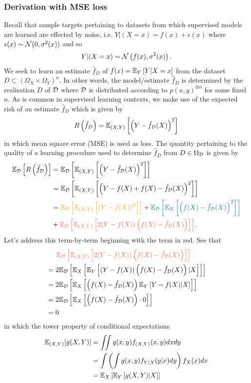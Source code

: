 \documentclass[11pt]{article}
\begin{document}
\subsubsection{Derivation with MSE loss}
Recall that sample targets pertaining to datasets from which supervised models are learned are effected by noise, i.e. $Y|(X=x)=f(x)+\epsilon(x)$ where $\epsilon(x)\sim\mathcal{N}(0,\sigma^2(x))$ and so
$$
Y|(X=x)
\sim
\mathcal{N}\left(f(x), \sigma^2(x)\right).
$$
We seek to learn an estimate $\hat{f}_{D}$ of $f(x)=\mathbb{E}_Y\left[Y|X=x\right]$ from the dataset $D\subset(\Omega_X\times\Omega_Y)^n$. In other words, the model/estimate $\hat{f}_{D}$ is determined by the realisation $D$ of $\mathcal{D}$ where $\mathcal{D}$ is distributed according to $p(x,y)^{\otimes n}$ for some fixed $n$. As is common in supervised learning contexts, we make use of the expected risk of an estimate $\hat{f}_D$ which is given by
$$
R\left(\hat{f}_D\right)
=
\mathbb{E}_{(X,Y)}\left[\left(Y-\hat{f}_D(X)\right)^2\right]
$$
in which mean square error (MSE) is used as loss. The quantity pertaining to the quality of a learning procedure used to determine $\hat{f}_{D}$ from $D\in\Omega_{\mathcal{D}}$ is given by
\begin{align*}
    \E_{\D}\l[R\l(\hat{f}_{\D}\r)\r]
    &=
    \E_{\D}\l[\E_{(X,Y)}\l[\l(Y-\hat{f}_{\D}(X)\r)^2\r]\r]\nonumber\\
    &=
    \E_{\D}\l[\E_{(X,Y)}\l[\l(Y-f(X)+f(X)-\hat{f}_{\D}(X)\r)^2\r]\r]\nonumber\\
    &=
    \textcolor{c5}{\E_{\D}\l[\E_{(X,Y)}\l[\l(Y-f(X)\r)^2\r]\r]}+
    \textcolor{c11}{\E_{\D}\l[\E_X\l[\l(f(X)-\hat{f}_{\D}(X)\r)^2\r]\r]}\\
    &+\textcolor{c3}{\E_{\D}\l[\E_{(X,Y)}\l[2(Y-f(X))\l(f(X)-\hat{f}_{\D}(X)\r)\r]\r]}.
\end{align*}
Let's address this term-by-term beginning with the term in red. See that
\begin{align*}
    &\hspace{14.52pt}
    \textcolor{c3}{\E_{\D}\l[\E_{(X,Y)}\l[2(Y-f(X))\l(f(X)-\hat{f}_{\D}(X)\r)\r]\r]}\\
    &=
    2\E_{\D}\l[\E_X\l[\E_{Y}\l[(Y-f(X))\l(f(X)-\hat{f}_{\D}(X)\r)|X\r]\r]\r]\\
    &=
    2\E_{\D}\l[\E_X\l[\l(f(X)-\hat{f}_{\D}(X)\r)\E_{Y}\l[Y-f(X)|X\r]\r]\r]\\
    &=
    2\E_{\D}\l[\E_X\l[\l(f(X)-\hat{f}_{\D}(X)\r)\cdot0\r]\r]\\
    &=
    0
\end{align*}
in which the tower property of conditional expectations
\begin{align*}
    \mathbb{E}_{(X,Y)}[g(X,Y)]
    &=
    \iint g(x,y)f_{(X,Y)}(x,y)dxdy\\
    &=
    \int \left(\int g(x,y)f_{Y|X}(y|x)dy\right)f_X(x)dx\\
    &=
    \mathbb{E}_X\left[\mathbb{E}_{Y}\left[g(X,Y)|X\right]\right]
\end{align*}
\end{document}
